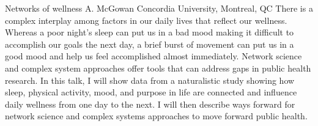 
    \begin{abstract_online}{Networks of wellness}{%
        A. McGowan}{%
        }{%
        Concordia University, Montreal, QC}
    There is a complex interplay among factors in our daily lives that reflect our wellness. Whereas a poor night's sleep can put us in a bad mood making it difficult to accomplish our goals the next day, a brief burst of movement can put us in a good mood and help us feel accomplished almost immediately. Network science and complex system approaches offer tools that can address gaps in public health research. In this talk, I will show data from a naturalistic study showing how sleep, physical activity, mood, and purpose in life are connected and influence daily wellness from one day to the next. I will then describe ways forward for network science and complex systems approaches to move forward public health. 
    
    \end{abstract_online}
    